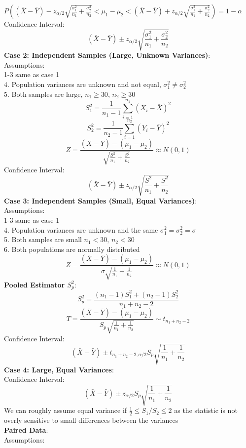 \documentclass{article}
\begin{document}
\begin{multicols*}{3}
$P((\bar{X}-\bar{Y})-z_{\alpha/2}\sqrt{\frac{\sigma_1^2}{n_1}+\frac{\sigma_2^2}{n_2}}<\mu_1-\mu_2<(\bar{X}-\bar{Y})+z_{\alpha/2}\sqrt{\frac{\sigma_1^2}{n_1}+\frac{\sigma_2^2}{n_2}})=1-\alpha$\\
Confidence Interval: \\
$$(\bar{X}-\bar{Y})\pm z_{\alpha/2}\sqrt{\frac{\sigma_1^2}{n_1}+\frac{\sigma_2^2}{n_2}}$$
\textbf{Case 2: Independent Samples (Large, Unknown Variances)}: \\
Assumptions: \\
1-3 same as case 1\\
4. Population variances are unknown and not equal, $\sigma_1^2\not=\sigma_2^2$\\
5. Both samples are large, $n_1\geq30$, $n_2\geq 30$
$$S_1^2=\frac{1}{n_1-1}\sum_{i=1}^{n_1}(X_i-\bar{X})^2$$
$$S_2^2=\frac{1}{n_2-1}\sum_{i=1}^{n_2}(Y_i-\bar{Y})^2$$ 
$$Z=\frac{(\bar{X}-\bar{Y})-(\mu_1-\mu_2)}{\sqrt{\frac{S^2}{n_1}+\frac{S^2}{n_2}}}\approx N(0,1)$$
Confidence Interval: \\
$$(\bar{X}-\bar{Y})\pm z_{\alpha/2}\sqrt{\frac{S^2}{n_1}+\frac{S^2}{n_2}}$$
\textbf{Case 3: Independent Samples (Small, Equal Variances)}: \\
Assumptions:\\
1-3 same as case 1\\
4. Population variances are unknown and the same $\sigma_1^2=\sigma_2^2=\sigma$\\
5. Both samples are small $n_1<30$, $n_2<30$\\
6. Both populations are normally distributed\\
$$Z=\frac{(\bar{X}-\bar{Y})-(\mu_1-\mu_2)}{\sigma\sqrt{\frac{1}{n_1}+\frac{1}{n_2}}}\approx N(0,1)$$
\textbf{Pooled Estimator $S^2_p$}: \\
$$S^2_p=\frac{(n_1-1)S_1^2+(n_2-1)S_2^2}{n_1+n_2-2}$$
$$T=\frac{(\bar{X}-\bar{Y})-(\mu_1-\mu_2)}{S_p\sqrt{\frac{1}{n_1}+\frac{1}{n_2}}}\sim t_{n_1+n_2-2}$$
Confidence Interval: 
$$(\bar{X}-\bar{Y})\pm t_{n_1+n_2-2;\alpha/2} S_p\sqrt{\frac{1}{n_1}+\frac{1}{n_2}}$$
\textbf{Case 4: Large, Equal Variances}: \\
Confidence Interval: 
$$(\bar{X}-\bar{Y})\pm z_{\alpha/2} S_p\sqrt{\frac{1}{n_1}+\frac{1}{n_2}}$$
We can roughly assume equal variance if $\frac{1}{2}\leq S_1/S_2\leq 2$ as the statistic is not overly sensitive to small differences between the variances \\
\textbf{Paired Data}: \\
Assumptions: \\

\end{multicols*}
\end{document}
